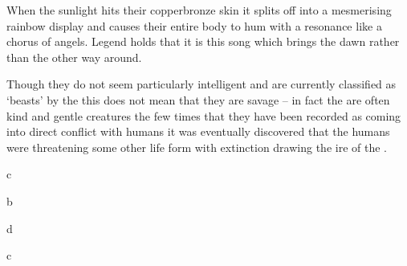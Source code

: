 {{When the sunlight hits their copper\minus{}bronze skin\comma{} it splits off into a mesmerising rainbow display\comma{} and causes their entire body to hum with a resonance like a chorus of angels. Legend holds that it is this song which brings the dawn\comma{} rather than the other way around.

Though they do not seem particularly intelligent\comma{} and are currently classified as `beasts’ by the \comma{} this does not mean that they are savage – in fact\comma{} the \name{} are often kind and gentle creatures\comma{} the few times that they have been recorded as coming into direct conflict with humans it was eventually discovered that the humans were threatening some other life form with extinction\comma{} drawing the ire of the \name{}.}



}




{
	c
}
{



















}








{
	b
}
{







}












{
	d
}
{










}




{
	c
}
{










}




